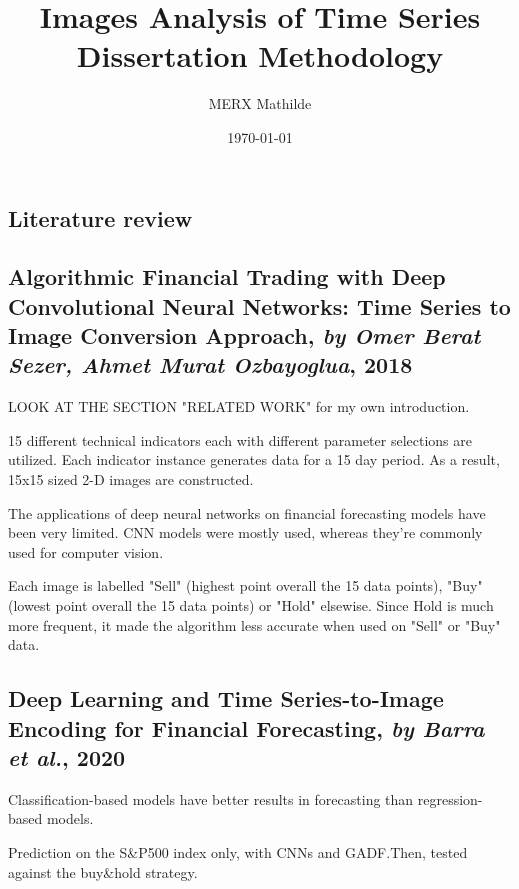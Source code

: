 \documentclass[11pt]{article}
\begin{document}
\begin{onehalfspace}


\title{%
Images Analysis of Time Series\\
\large Dissertation Methodology}
\date{{\today}}
\author{MERX Mathilde}

\maketitle 

\tableofcontents


\pagebreak

\section{Literature review}

\subsection{Algorithmic Financial Trading with Deep Convolutional Neural Networks: Time Series to Image Conversion Approach, \textit{by Omer Berat Sezer, Ahmet Murat Ozbayoglua}, 2018}

LOOK AT THE SECTION "RELATED WORK" for my own introduction.

15 diﬀerent technical indicators each with diﬀerent parameter selections are utilized. Each indicator instance generates data for a 15 day period. As a result, 15x15 sized 2-D images are constructed. 

The applications of deep neural networks on ﬁnancial forecasting models have been very limited. CNN models were mostly used, whereas they're commonly used for computer vision.

Each image is labelled "Sell" (highest point overall the 15 data points), "Buy" (lowest point overall the 15 data points) or "Hold" elsewise. Since Hold is much more frequent, it made the algorithm less accurate when used on "Sell" or "Buy" data. 

\subsection{Deep Learning and Time Series-to-Image Encoding for Financial Forecasting, \textit{by Barra et al.}, 2020}

Classification-based models have better results in forecasting than regression-based models.

Prediction on the S\&P500 index only, with CNNs and GADF.Then, tested against the buy\&hold strategy. 


\end{onehalfspace}
\end{document}
